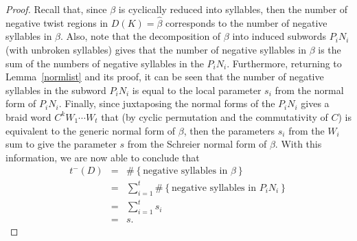\documentclass{article}
\begin{document}
\begin{proof}
Recall that, since $\beta$ is cyclically reduced into syllables, then the number of negative twist regions in $D(K)=\widehat{\beta}$ corresponds to the number of negative syllables in $\beta$. Also, note that the decomposition of $\beta$ into induced subwords $P_{i}N_{i}$ (with unbroken syllables) gives that the number of negative syllables in $\beta$ is the sum of the numbers of negative syllables in the $P_{i}N_{i}$. Furthermore, returning to Lemma~\ref{normlist} and its proof, it can be seen that the number of negative syllables in the subword $P_{i}N_{i}$ is equal to the local parameter $s_{i}$ from the normal form of $P_{i}N_{i}$. Finally, since juxtaposing the normal forms of the $P_{i}N_{i}$ gives a braid word $C^{k}W_{1} \cdots W_{t}$ that (by cyclic permutation and the commutativity of $C$) is equivalent to the generic normal form of $\beta$, then the parameters $s_{i}$ from the $W_{i}$ sum to give the parameter $s$ from the Schreier normal form of $\beta$. With this information, we are now able to conclude that
\begin{eqnarray*}
t^{-}(D) & = & \#\left\{\text{negative\ syllables\ in\ }\beta\right\}\\
\ & = & \sum_{i=1}^{t} \#\left\{\text{negative\ syllables\ in\ }P_{i}N_{i}\right\}\\
\ & = & \sum_{i=1}^{t} s_{i}\\
\ & = & s.
\end{eqnarray*}  

\end{proof}
































\end{document}
